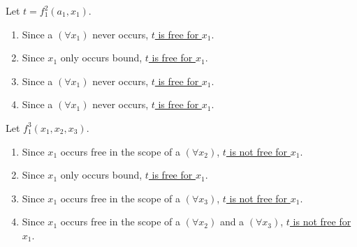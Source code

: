 \begin{enumerate}
    Let \(t = f^2_1(a_1, x_1)\).
    \begin{enumerate}[label = (\alph*), align = left]
      \item Since a \((\forall x_1)\) never occurs, \underline{\(t\) is free for \(x_1\)}.
      \item Since \(x_1\) only occurs bound, \underline{\(t\) is free for \(x_1\)}.
      \item Since a \((\forall x_1)\) never occurs, \underline{\(t\) is free for \(x_1\)}.
      \item Since a \((\forall x_1)\) never occurs, \underline{\(t\) is free for \(x_1\)}.
    \end{enumerate}

    Let \(f^3_1(x_1, x_2, x_3)\).
    \begin{enumerate}[label = (\alph*), align = left]
      \item Since \(x_1\) occurs free in the scope of a \((\forall x_2)\), \underline{\(t\) is not free for \(x_1\)}.
      \item Since \(x_1\) only occurs bound, \underline{\(t\) is free for \(x_1\)}.
      \item Since \(x_1\) occurs free in the scope of a \((\forall x_3)\), \underline{\(t\) is not free for \(x_1\)}.
      \item Since \(x_1\) occurs free in the scope of a \((\forall x_2)\) and a \((\forall x_3)\), \underline{\(t\) is not free for \(x_1\)}.
    \end{enumerate}
\end{enumerate}
